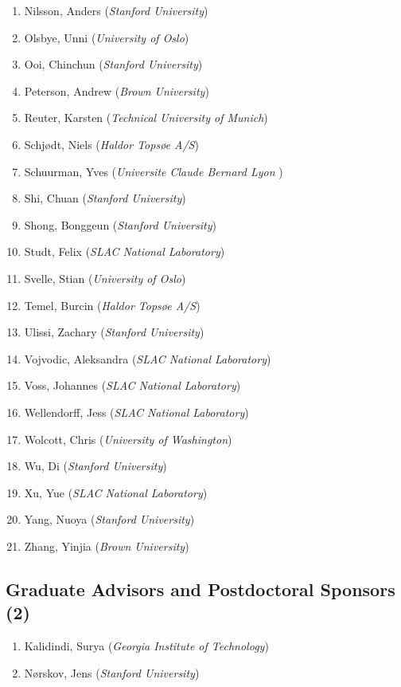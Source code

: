 \begin{enumerate}
\item
  Nilsson, Anders (\emph{Stanford University})
\item
  Olsbye, Unni (\emph{University of Oslo})
\item
  Ooi, Chinchun (\emph{Stanford University})
\item
  Peterson, Andrew (\emph{Brown University})
\item
  Reuter, Karsten (\emph{Technical University of Munich})
\item
  Schjødt, Niels (\emph{Haldor Topsøe A/S})
\item
  Schuurman, Yves (\emph{Universite Claude Bernard Lyon })
\item
  Shi, Chuan (\emph{Stanford University})
\item
  Shong, Bonggeun (\emph{Stanford University})
\item
  Studt, Felix (\emph{SLAC National Laboratory})
\item
  Svelle, Stian (\emph{University of Oslo})
\item
  Temel, Burcin (\emph{Haldor Topsøe A/S})
\item
  Ulissi, Zachary (\emph{Stanford University})
\item
  Vojvodic, Aleksandra (\emph{SLAC National Laboratory})
\item
  Voss, Johannes (\emph{SLAC National Laboratory})
\item
  Wellendorff, Jess (\emph{SLAC National Laboratory})
\item
  Wolcott, Chris (\emph{University of Washington})
\item
  Wu, Di (\emph{Stanford University})
\item
  Xu, Yue (\emph{SLAC National Laboratory})
\item
  Yang, Nuoya (\emph{Stanford University})
\item
  Zhang, Yinjia (\emph{Brown University})
\end{enumerate}

\subsection{Graduate Advisors and Postdoctoral Sponsors
(2)}\label{graduate-advisors-and-postdoctoral-sponsors-2}

\begin{enumerate}
\def\labelenumi{\arabic{enumi}.}
\itemsep1pt\parskip0pt
\item
  Kalidindi, Surya (\emph{Georgia Institute of Technology})
\item
  Nørskov, Jens (\emph{Stanford University})
\end{enumerate}

